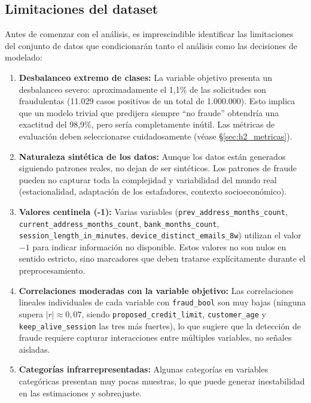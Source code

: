 \documentclass[12pt,a4paper]{report}
\begin{document}
\subsection{Limitaciones del dataset}
\label{subsec:limitaciones}

Antes de comenzar con el análisis, es imprescindible identificar las limitaciones del conjunto de datos que condicionarán tanto el análisis como las decisiones de modelado:

\begin{enumerate}
    \item \textbf{Desbalanceo extremo de clases:} La variable objetivo presenta un desbalanceo severo: aproximadamente el 1,1\% de las solicitudes son fraudulentas (11.029 casos positivos de un total de 1.000.000). Esto implica que un modelo trivial que predijera siempre ``no fraude'' obtendría una exactitud del 98,9\%, pero sería completamente inútil. Las métricas de evaluación deben seleccionarse cuidadosamente (véase \S\ref{sec:h2_metricas}).

    \item \textbf{Naturaleza sintética de los datos:} Aunque los datos están generados siguiendo patrones reales, no dejan de ser sintéticos. Los patrones de fraude pueden no capturar toda la complejidad y variabilidad del mundo real (estacionalidad, adaptación de los estafadores, contexto socioeconómico).

    \item \textbf{Valores centinela (-1):} Varias variables (\texttt{prev\_address\_months\_count}, \texttt{current\_address\_months\_count}, \texttt{bank\_months\_count}, \texttt{session\_length\_in\_minutes}, \texttt{device\_distinct\_emails\_8w}) utilizan el valor $-1$ para indicar información no disponible. Estos valores no son nulos en sentido estricto, sino marcadores que deben tratarse explícitamente durante el preprocesamiento.

    \item \textbf{Correlaciones moderadas con la variable objetivo:} Las correlaciones lineales individuales de cada variable con \texttt{fraud\_bool} son muy bajas (ninguna supera $|r| \approx 0{,}07$, siendo \texttt{proposed\_credit\_limit}, \texttt{customer\_age} y \texttt{keep\_alive\_session} las tres más fuertes), lo que sugiere que la detección de fraude requiere capturar interacciones entre múltiples variables, no señales aisladas.

    \item \textbf{Categorías infrarrepresentadas:} Algunas categorías en variables categóricas presentan muy pocas muestras, lo que puede generar inestabilidad en las estimaciones y sobreajuste.


\end{enumerate}
\end{document}

